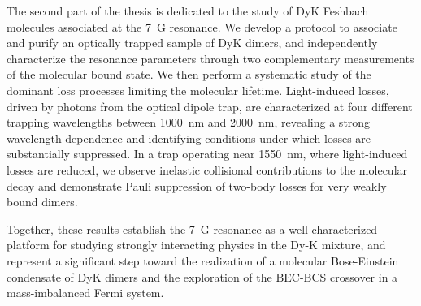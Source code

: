 The second part of the thesis is dedicated to the study of DyK Feshbach molecules associated at the \SI{7}{G} resonance. We develop a protocol to associate and purify an optically trapped sample of DyK dimers, and independently characterize the resonance parameters through two complementary measurements of the molecular bound state. We then perform a systematic study of the dominant loss processes limiting the molecular lifetime. Light-induced losses, driven by photons from the optical dipole trap, are characterized at four different trapping wavelengths between \SI{1000}{nm} and \SI{2000}{nm}, revealing a strong wavelength dependence and identifying conditions under which losses are substantially suppressed. In a trap operating near \SI{1550}{nm}, where light-induced losses are reduced, we observe inelastic collisional contributions to the molecular decay and demonstrate Pauli suppression of two-body losses for very weakly bound dimers.

Together, these results establish the \SI{7}{G} resonance as a well-characterized platform for studying strongly interacting physics in the Dy-K mixture, and represent a significant step toward the realization of a molecular Bose-Einstein condensate of DyK dimers and the exploration of the BEC-BCS crossover in a mass-imbalanced Fermi system.


\newpage

